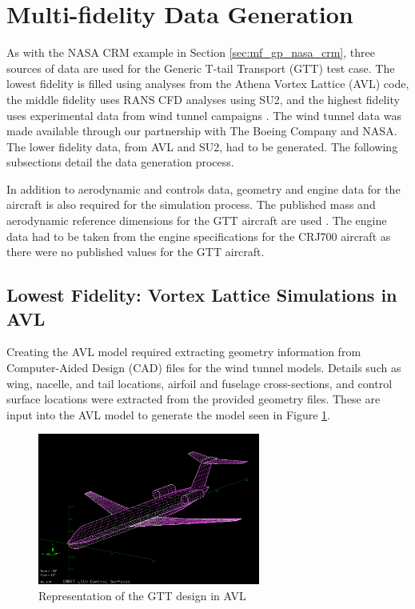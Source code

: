 \section{Multi-fidelity Data Generation} \label{sec:data_gen}

As with the NASA CRM example in Section \ref{sec:mf_gp_nasa_crm}, three sources of data are used for the Generic T-tail Transport (GTT) test case. 
The lowest fidelity is filled using analyses from the Athena Vortex Lattice (AVL) code, the middle fidelity uses RANS CFD analyses using SU2, and the highest fidelity uses experimental data from wind tunnel campaigns \cite{cunningham_generic_2018,cunningham_preliminary_2018}.
The wind tunnel data was made available through our partnership with The Boeing Company and NASA. 
The lower fidelity data, from AVL and SU2, had to be generated.
The following subsections detail the data generation process. 

In addition to aerodynamic and controls data, geometry and engine data for the aircraft is also required for the simulation process. 
The published mass and aerodynamic reference dimensions for the GTT aircraft are used \cite{cunningham_generic_2018}.
The engine data had to be taken from the engine specifications for the CRJ700 aircraft as there were no published values for the GTT aircraft.

\subsection{Lowest Fidelity: Vortex Lattice Simulations in AVL} \label{sec:data_gen_avl}
Creating the AVL model required extracting geometry information from Computer-Aided Design (CAD) files for the wind tunnel models. 
Details such as wing, nacelle, and tail locations, airfoil and fuselage cross-sections, and control surface locations were extracted from the provided geometry files. 
These are input into the AVL model to generate the model seen in Figure \ref{fig:gmatt_avl}. 

\begin{figure}
    \center
    \includegraphics[width=0.65\textwidth]{suthesis/images/gmatt_avl.png}
    \caption{Representation of the GTT design in AVL \label{fig:gmatt_avl}}
\end{figure}

